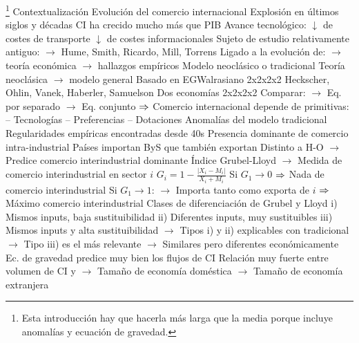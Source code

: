 \documentclass{nuevotema}
\begin{document}
\esquemalargo














\begin{esquemal}
	\1[] \footnote{Esta introducción hay que hacerla más larga que la media porque incluye anomalías y ecuación de gravedad.}
		\2 Contextualización
			\3 Evolución del comercio internacional
				\4 Explosión en últimos siglos y décadas
				\4[] CI ha crecido mucho más que PIB
				\4 Avance tecnológico:
				\4[] $\downarrow$ de costes de transporte
				\4[] $\downarrow$ de costes informacionales
				\4 Sujeto de estudio relativamente antiguo:
				\4[] $\to$ Hume, Smith, Ricardo, Mill, Torrens
				\4[] Ligado a la evolución de:
				\4[] $\to$ teoría económica
				\4[] $\to$ hallazgos empíricos
			\3 Modelo neoclásico o tradicional
				\4 Teoría neoclásica $\to$ modelo general
				\4[] Basado en EGWalrasiano 2x2x2x2
				\4[] Heckscher, Ohlin, Vanek, Haberler, Samuelson
				\4[] Dos economías 2x2x2x2
				\4[] Comparar:
				\4[] $\to$ Eq. por separado
				\4[] $\to$ Eq. conjunto
				\4[] $\Rightarrow$ Comercio internacional depende de primitivas:
				\4[] -- Tecnologías
				\4[] -- Preferencias
				\4[] -- Dotaciones
			\3 Anomalías del modelo tradicional
				\4 Regularidades empíricas encontradas desde 40s
				\4[I] Presencia dominante de comercio intra-industrial
				\4[] Países importan ByS que también exportan
				\4[] Distinto a H-O
				\4[] $\to$ Predice comercio interindustrial dominante
				\4[] Índice Grubel-Lloyd
				\4[] $\to$ Medida de comercio interindustrial en sector $i$
				\4[] $G_i = 1 - \frac{\left| X_i - M_i \right|}{X_i + M_i}$
				\4[] Si $G_1 \to 0$
				\4[] $\Rightarrow$ Nada de comercio interindustrial
				\4[] Si $G_1 \to 1$:
				\4[] $\to$ Importa tanto como exporta de $i$
				\4[] $\Rightarrow$ Máximo comercio interindustrial
				\4[] Clases de diferenciación de Grubel y Lloyd
				\4[] i) Mismos inputs, baja sustituibilidad
				\4[] ii) Diferentes inputs, muy sustituibles
				\4[] iii) Mismos inputs y alta sustituibilidad
				\4[] $\to$ Tipos i) y ii) explicables con tradicional
				\4[] $\to$ Tipo iii) es el más relevante
				\4[] $\to$ Similares pero diferentes  económicamente
				\4[II] Ec. de gravedad predice muy bien los flujos de CI
				\4[] Relación muy fuerte entre volumen de CI y
				\4[] $\to$ Tamaño de economía doméstica
				\4[] $\to$ Tamaño de economía extranjera

\end{esquemal}
\end{document}
